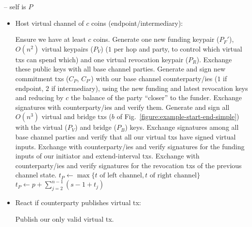 \begin{center}
\begin{processbox}{\pchan -- self is $P$}
\begin{itemize}
      \item Host virtual channel of $c$ coins (endpoint/intermediary):
      \begin{algorithmic}[0]
        \State Ensure we have at least $c$ coins.
        \State Generate one new funding keypair ($P_F'$), $O(n^2)$ virtual
        keypairs ($P_V$)
        ($1$ per hop and party, to control which virtual txs can spend which) and one virtual revocation keypair ($P_R$).
        \State {}
        \State Exchange these public keys with all base channel parties.
        \State Generate and sign new commitment txs ($C_P$, $C_{P'}$) with our
        base channel counterparty/ies
        ($1$ if endpoint, $2$ if intermediary), using the new funding and latest
        revocation keys and reducing by $c$ the balance of the party ``closer''
        to the funder.
        \State Exchange signatures with counterparty/ies and verify them.
        \State Generate and sign all $O(n^3)$ virtual and bridge txs ($b$ of
        Fig.~\ref{figure:example-start-end-simple}) with the virtual ($P_V$) and
        bridge ($P_B$) keys.
        \State Exchange signatures among all base channel parties and verify
        that all our virtual txs have signed virtual inputs.
        \State Exchange with counterparty/ies and verify signatures for the
        funding inputs of our initiator and extend-interval txs.
        \State Exchange with counterparty/ies and verify signatures for the
        revocation txs of the previous channel state.
          \State $t_P \gets \max\{t \text{ of left channel}, t \text{ of right
          channel}\}$
        \Else \: 
          \State $t_P \gets p + \sum_{j = 2}^{n-1}(s - 1 + t_j)$
        \EndIf
      \end{algorithmic}

      \item React if counterparty publishes virtual tx:
      \begin{algorithmic}[0]
        \State Publish our only valid virtual tx. 
      \end{algorithmic}


\end{itemize}
\end{processbox}
\end{center}
